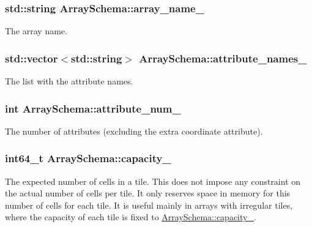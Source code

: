 \subsubsection[{array\+\_\+name\+\_\+}]{\setlength{\rightskip}{0pt plus 5cm}std\+::string Array\+Schema\+::array\+\_\+name\+\_\+\hspace{0.3cm}{\ttfamily [private]}}\label{classArraySchema_aa30b1f9b3be749d5c5c72c3c44b57bc4}
The array name. \hypertarget{classArraySchema_ac7b21b43f42638db785c039dcaefa184}{}
\subsubsection[{attribute\+\_\+names\+\_\+}]{\setlength{\rightskip}{0pt plus 5cm}std\+::vector$<$std\+::string$>$ Array\+Schema\+::attribute\+\_\+names\+\_\+\hspace{0.3cm}{\ttfamily [private]}}\label{classArraySchema_ac7b21b43f42638db785c039dcaefa184}
The list with the attribute names. \hypertarget{classArraySchema_a4b51afed85b1d0d79ad2f2365d9d5c1c}{}
\subsubsection[{attribute\+\_\+num\+\_\+}]{\setlength{\rightskip}{0pt plus 5cm}int Array\+Schema\+::attribute\+\_\+num\+\_\+\hspace{0.3cm}{\ttfamily [private]}}\label{classArraySchema_a4b51afed85b1d0d79ad2f2365d9d5c1c}
The number of attributes (excluding the extra coordinate attribute). \hypertarget{classArraySchema_a9b38e7051d7c1cb5f3bcedf850439c29}{}
\subsubsection[{capacity\+\_\+}]{\setlength{\rightskip}{0pt plus 5cm}int64\+\_\+t Array\+Schema\+::capacity\+\_\+\hspace{0.3cm}{\ttfamily [private]}}\label{classArraySchema_a9b38e7051d7c1cb5f3bcedf850439c29}
The expected number of cells in a tile. This does not impose any constraint on the actual number of cells per tile. It only reserves space in memory for this number of cells for each tile. It is useful mainly in arrays with irregular tiles, where the capacity of each tile is fixed to \hyperlink{classArraySchema_a9b38e7051d7c1cb5f3bcedf850439c29}{Array\+Schema\+::capacity\+\_\+}. \hypertarget{classArraySchema_af067d28d340153d911fe3252d100588d}{}
